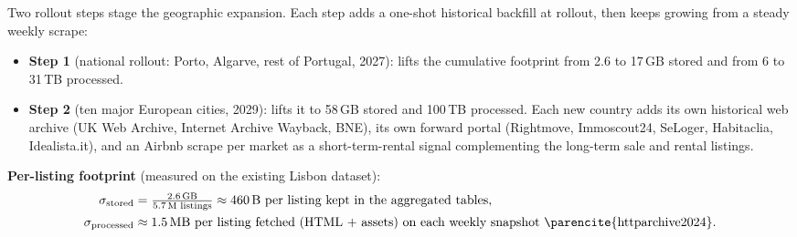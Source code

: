 \documentclass[11pt,a4paper]{article}
\begin{document}
Two rollout steps stage the geographic expansion. Each step adds a one-shot historical backfill at rollout, then keeps growing from a steady weekly scrape:
\begin{itemize}
  \item \textbf{Step 1} (national rollout: Porto, Algarve, rest of Portugal, 2027): lifts the cumulative footprint from 2.6 to 17\,GB stored and from 6 to 31\,TB processed.
  \item \textbf{Step 2} (ten major European cities, 2029): lifts it to 58\,GB stored and 100\,TB processed. Each new country adds its own historical web archive (UK Web Archive, Internet Archive Wayback, BNE), its own forward portal (Rightmove, Immoscout24, SeLoger, Habitaclia, Idealista.it), and an Airbnb scrape per market as a short-term-rental signal complementing the long-term sale and rental listings.
\end{itemize}

\textbf{Per-listing footprint} (measured on the existing Lisbon dataset):
\begin{align*}
\sigma_{\text{stored}}    &= \tfrac{2.6\,\text{GB}}{5.7\,\text{M listings}} \approx 460\,\text{B per listing kept in the aggregated tables}, \\
\sigma_{\text{processed}} &\approx 1.5\,\text{MB per listing fetched (HTML + assets) on each weekly snapshot~\parencite{httparchive2024}.}
\end{align*}
\end{document}
